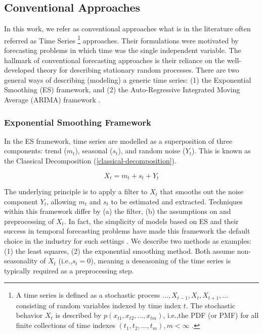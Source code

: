 \subsection{Conventional Approaches}
In this work, we refer as conventional approaches what is in the literature often referred as Time Series \footnote{A time series is defined as a stochastic process ${..., X_{t-1}, X_{t}, X_{t+1}, ...}$ consisting of random variables indexed by time index $t$. The stochastic behavior ${X_t}$ is described by $p(x_{t1}, x_{t2}, ..., x_{tm})$, i.e.,the PDF (or PMF) for all finite collections of time indexes ${(t_1, t_2, ..., t_m), m<\infty}$ \cite{kempthorne2013s0196}. } approaches.
Their formulations were motivated by forecasting problems in which time was the single independent variable.
The hallmark of conventional forecasting approaches is their reliance on the well-developed theory for describing stationary random processes. 
There are two general ways of describing (modeling) a generic time series: (1) the Exponential Smoothing (ES) framework, and (2) the Auto-Regressive Integrated Moving Average (ARIMA) framework \cite{brockwell1991methods}. 

\subsubsection{Exponential Smoothing Framework}
In the ES framework, time series are modelled as a superposition of three components: trend ($m_t$), seasonal ($s_t$), and random noise ($Y_t$).
This is known as the Classical Decomposition (\autoref{classical-decomposition}).

\begin{equation}\label{classical-decomposition}
    X_t = m_t + s_t + Y_t
\end{equation}

The underlying principle is to apply a filter to $X_t$ that smooths out the noise component $Y_t$, allowing $m_t$ and $s_t$ to be estimated and extracted.
Techniques within this framework differ by (a) the filter, (b) the assumptions on and preprocessing of $X_t$. 
In fact, the simplicity of models based on ES and their success in temporal forecasting problems have made this framework the default choice in the industry for such settings \cite{holt2004forecasting}.
We describe two methods as examples: (1) the least squares, (2) the exponential smoothing method.
Both assume non-seasonality of $X_t$ (i.e.,$s_t=0$), meaning a deseasoning of the time series is typically required as a preprocessing step.

